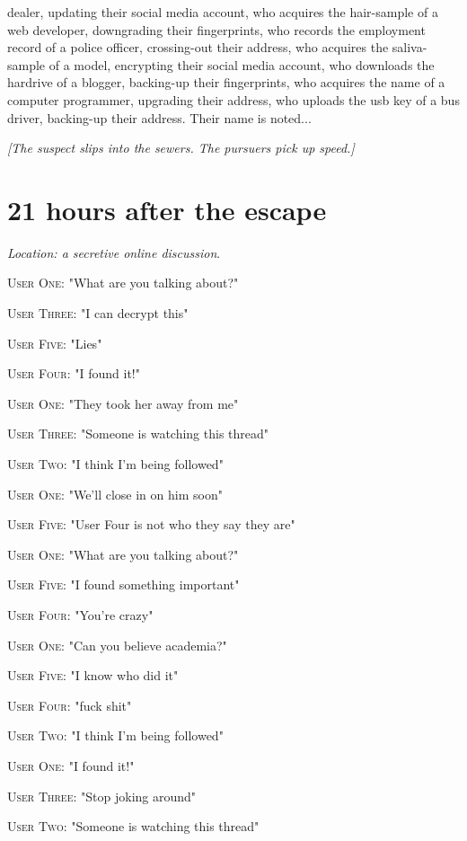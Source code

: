 \documentclass{report}
\begin{document}
dealer, updating their social media account, who acquires the hair-sample of a web developer, downgrading their fingerprints, who records the employment record of a police officer, crossing-out their address, who acquires the saliva-sample of a model, encrypting their social media account, who downloads the hardrive of a blogger, backing-up their fingerprints, who acquires the name of a computer programmer, upgrading their address, who uploads the usb key of a bus driver, backing-up their address. Their name is noted...

\textit{[The suspect slips into the sewers. The pursuers pick up speed.]}


\section*{21 \small{hours after the escape}}

\textit{Location: a secretive online discussion}. 

\textsc{User One}: "What are you talking about?" 

\textsc{User Three}: "I can decrypt this" 

\textsc{User Five}: "Lies" 

\textsc{User Four}: "I found it!" 

\textsc{User One}: "They took her away from me" 

\textsc{User Three}: "Someone is watching this thread" 

\textsc{User Two}: "I think I'm being followed" 

\textsc{User One}: "We'll close in on him soon" 

\textsc{User Five}: "User Four is not who they say they are" 

\textsc{User One}: "What are you talking about?" 

\textsc{User Five}: "I found something important" 

\textsc{User Four}: "You're crazy" 

\textsc{User One}: "Can you believe academia?" 

\textsc{User Five}: "I know who did it" 

\textsc{User Four}: "fuck shit" 

\textsc{User Two}: "I think I'm being followed" 

\textsc{User One}: "I found it!" 

\textsc{User Three}: "Stop joking around" 

\textsc{User Two}: "Someone is watching this thread" 
\end{document}
